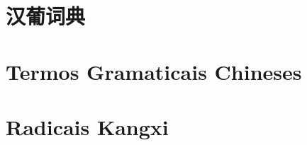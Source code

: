 \documentclass[a4paper,9pt,twoside,openany]{memoir}
\begin{document}



\clearpage
\pagestyle{empty}
\tableofcontents

\clearpage
\pagestyle{empty}
\chapter{汉葡词典}

%
%
%

\clearpage
\pagestyle{dicionario}
\begin{multicols}{2}























\end{multicols}

\clearpage
\pagestyle{plain}
\chapter{Termos Gramaticais Chineses}


\clearpage
\pagestyle{plain}
\chapter{Radicais Kangxi}


\printindex[stroke]
\printindex[radical]
\end{document}
